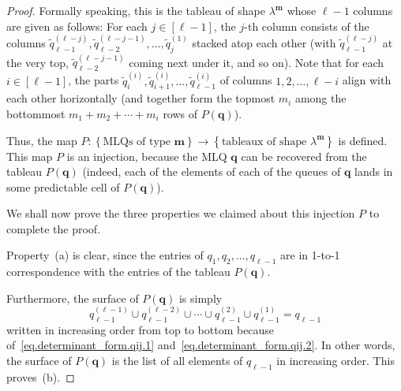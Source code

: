 \documentclass[reqno]{amsart}
\newcommand{\0}{\phantom{c}}
\newcommand{\mm}{\mathbf{m}}
\newcommand{\qq}{\mathbf{q}}
\newcommand{\set}[1]{\left\{ #1 \right\}}
\newcommand{\ive}[1]{\left[ #1 \right]}
\theoremstyle{plain}
\theoremstyle{definition}
\numberwithin{equation}{section}
\begin{document}
\begin{proof}
Formally speaking, this is the tableau of shape $\lambda^{\mm}$ whose $\ell-1$ columns are given as follows:
For each $j \in \ive{\ell-1}$, the $j$-th column consists of the columns $\widetilde{q}_{\ell-1}^{(\ell-j)}, \widetilde{q}_{\ell-2}^{(\ell-j-1)}, \dotsc, \widetilde{q}_j^{(1)}$ stacked atop each other (with $\widetilde{q}_{\ell-1}^{(\ell-j)}$ at the very top, $\widetilde{q}_{\ell-2}^{(\ell-j-1)}$ coming next under it, and so on).
Note that for each $i \in \ive{\ell-1}$, the parts $\widetilde{q}_i^{(i)}, \widetilde{q}_{i+1}^{(i)}, \dotsc, \widetilde{q}_{\ell-1}^{(i)}$ of columns $1,2,\ldots,\ell-i$ align with each other horizontally (and together form the topmost $m_i$ among the bottommost $m_1+m_2+\cdots+m_i$ rows of $P(\qq)$).

Thus, the map $P \colon \set{ \text{MLQs of type } \mm } \to \set{\text{tableaux of shape } \lambda^{\mm}}$ is defined.
This map $P$ is an injection, because the MLQ $\qq$ can be recovered
from the tableau $P(\qq)$ (indeed, each of the elements
of each of the queues of $\qq$ lands in some predictable cell of
$P(\qq)$).

We shall now prove the three properties we claimed about this injection $P$ to complete the proof.

Property~(a) is clear, since the entries of $q_1, q_2, \dotsc, q_{\ell-1}$ are in 1-to-1 correspondence with the entries of the tableau $P(\qq)$.

Furthermore, the surface of $P(\qq)$ is simply
\[
q_{\ell-1}^{(\ell-1)} \cup q_{\ell-1}^{(\ell-2)} \cup \cdots \cup q_{\ell-1}^{(2)} \cup q_{\ell-1}^{(1)} = q_{\ell-1}
\]
written in increasing order from top to bottom because of~\eqref{eq.determinant_form.qij.1} and~\eqref{eq.determinant_form.qij.2}.
In other words, the surface of $P(\qq)$ is the list of all elements of $q_{\ell-1}$ in increasing order.
This proves~(b).


\end{proof}
\end{document}
